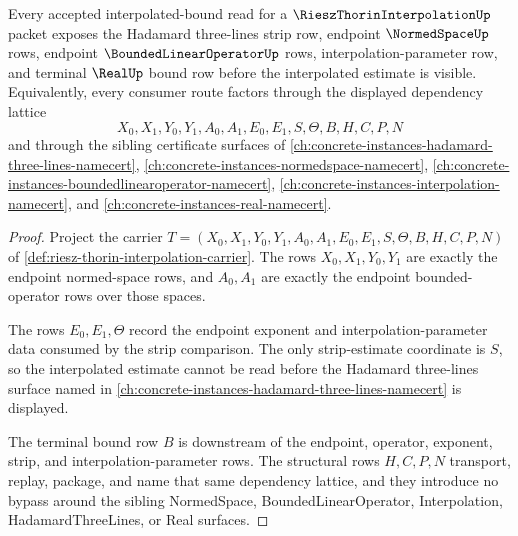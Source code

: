 \begin{theorem}
\label{thm:riesz-thorin-interpolation-horizontal-dependency-route}
Every accepted interpolated-bound read for a $\RieszThorinInterpolationUp$ packet exposes the Hadamard three-lines strip row, endpoint $\NormedSpaceUp$ rows, endpoint $\BoundedLinearOperatorUp$ rows, interpolation-parameter row, and terminal $\RealUp$ bound row before the interpolated estimate is visible. Equivalently, every consumer route factors through the displayed dependency lattice
$$
X_0,X_1,Y_0,Y_1,A_0,A_1,E_0,E_1,S,\Theta,B,H,C,P,N
$$
and through the sibling certificate surfaces of \autoref{ch:concrete-instances-hadamard-three-lines-namecert}, \autoref{ch:concrete-instances-normedspace-namecert}, \autoref{ch:concrete-instances-boundedlinearoperator-namecert}, \autoref{ch:concrete-instances-interpolation-namecert}, and \autoref{ch:concrete-instances-real-namecert}.
\end{theorem}
\begin{proof}
Project the carrier $T=(X_0,X_1,Y_0,Y_1,A_0,A_1,E_0,E_1,S,\Theta,B,H,C,P,N)$ of \autoref{def:riesz-thorin-interpolation-carrier}. The rows $X_0,X_1,Y_0,Y_1$ are exactly the endpoint normed-space rows, and $A_0,A_1$ are exactly the endpoint bounded-operator rows over those spaces.

The rows $E_0,E_1,\Theta$ record the endpoint exponent and interpolation-parameter data consumed by the strip comparison. The only strip-estimate coordinate is $S$, so the interpolated estimate cannot be read before the Hadamard three-lines surface named in \autoref{ch:concrete-instances-hadamard-three-lines-namecert} is displayed.

The terminal bound row $B$ is downstream of the endpoint, operator, exponent, strip, and interpolation-parameter rows. The structural rows $H,C,P,N$ transport, replay, package, and name that same dependency lattice, and they introduce no bypass around the sibling NormedSpace, BoundedLinearOperator, Interpolation, HadamardThreeLines, or Real surfaces.
\end{proof}


